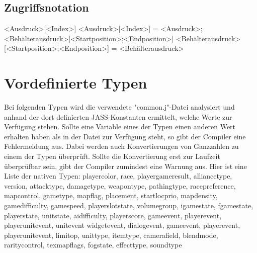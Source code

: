 \subsection{Zugriffsnotation}
<Ausdruck>[<Index>]
<Ausdruck>[<Index>] = <Ausdruck>;
<Behälterausdruck>[<Startposition>;<Endposition>]
<Behälterausdruck>[<Startposition>;<Endposition>] = <Behälterausdruck>

\section{Vordefinierte Typen}
Bei folgenden Typen wird die verwendete "common.j"-Datei analysiert und anhand der dort definierten JASS-Konstanten
ermittelt, welche Werte zur Verfügung stehen. Sollte eine Variable eines der Typen einen anderen Wert erhalten
haben als in der Datei zur Verfügung steht, so gibt der Compiler eine Fehlermeldung aus.
Dabei werden auch Konvertierungen von Ganzzahlen zu einem der Typen überprüft. Sollte die Konvertierung erst zur
Laufzeit überprüfbar sein, gibt der Compiler zumindest eine Warnung aus.
Hier ist eine Liste der nativen Typen:
playercolor, race, playergameresult, alliancetype, version, attacktype, damagetype, weapontype, pathingtype, racepreference,
mapcontrol, gametype, mapflag, placement, startlocprio, mapdensity, gamedifficulty, gamespeed, playerslotstate, volumegroup,
igamestate, fgamestate, playerstate, unitstate, aidifficulty, playerscore, gameevent, playerevent, playerunitevent, unitevent
widgetevent, dialogevent, gameevent, playerevent, playerunitevent, limitop, unittype, itemtype, camerafield, blendmode, raritycontrol,
texmapflags, fogstate, effecttype, soundtype 